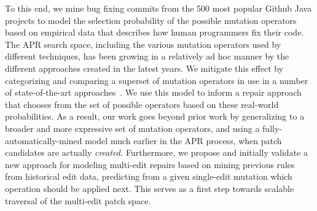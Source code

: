 \documentclass[conference]{IEEEtran}
\begin{document}
To this end, we mine bug fixing commits from 
the 500 most popular Github Java projects to model the selection probability of
the possible mutation operators based on 
empirical data that describes how human programmers fix their code.  
The APR search space, including the various mutation
operators used by different techniques, has been growing in a relatively ad hoc 
manner by the different approaches created in the latest years. We mitigate this effect by categorizing and comparing a superset of
mutation operators in use in a number of 
state-of-the-art approaches~\cite{legoues12,Weimer13,kim2013,long16proph}.
We use this model to inform a repair approach that chooses from the set of possible
operators based on these real-world probabilities.
As a result, our work goes beyond prior work  by generalizing
to a broader and more expressive set of
mutation operators, and using a fully-automatically-mined model much 
earlier in the APR process, when patch candidates are actually \emph{created.}
Furthermore, we propose and initially validate a new approach for modeling
multi-edit repairs based on mining previous rules from historical edit data, 
predicting from a given 
single-edit mutation which operation should be applied
next.  This serves  as a first step towards
scalable traversal of the multi-edit patch space. 
\end{document}
